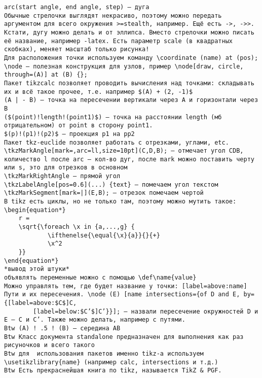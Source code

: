 \documentclass[a4paper, 12pt]{article}
\begin{document}
\begin{verbatim}
arc(start angle, end angle, step) – дуга
Обычные стрелочки выглядят некрасиво, поэтому можно передать аргументом для всего окружения >=stealth, например. Ещё есть ->, ->>. Кстати, дугу можно делать и от эллипса. Вместо стрелочки можно писать её название, например -latex. Есть параметр scale (в квадратных скобках), меняет масштаб только рисунка!
Для расположения точки используем команду \coordinate (name) at (pos);
\node – полезная конструкция для узлов, пример \node[draw, circle, through=(A)] at (B) {};
Пакет tikzcalc позволяет проводить вычисления над точками: складывать их и всё такое прочее, т.е. например $(A) + (2, -1)$
(A | - B) – точка на пересечении вертикали через A и горизонтали через B
($(point)!length!(point1)$) – точка на расстоянии length (мб отрицательном) от point в сторону point1.
$(p)!(p1)!(p2)$ – проекция p1 на pp2
Пакет tkz-euclide позволяет работать с отрезками, углами, etc.
\tkzMarkAngle[mark=,arc=ll,size=10pt](C,D,B); – отмечает угол CDB, количество l после arc – кол-во дуг, после mark можно поставить черту или s, это для отрезков в основном
\tkzMarkRightAngle – прямой угол
\tkzLabelAngle[pos=0.6](...) {text} – помечаем угол текстом
\tkzMarkSegment[mark=|](E,B); – отрезок помечаем чертой
В tikz есть циклы, но не только там, поэтому можно мутить такое:
\begin{equation*}
	r =
	\sqrt{\foreach \x in {a,...,g} {
			\ifthenelse{\equal{\x}{a}}{}{+}
			\x^2
	}}
\end{equation*}
*вывод этой штуки* 
объявлять переменные можно с помощью \def\name{value}
Можно управлять тем, где будет название у точки: [label=above:name]
Пути и их пересечения. \node (E) [name intersections={of D and E, by={[label=above:$C$]C,
		[label=below:$C’$]C’}}]; – назвали пересечение окружностей D и E – C и C’. Также можно делать, например с путями.
Btw (A) ! .5 ! (B) – середина AB
Btw Класс документа standalone предназначен для выполнения как раз рисуночков и всего такого
Btw для  использования пакетов именно tikz-а используем \usetikzlibrary{name} (например calc, intersections и т.д.)
Btw Есть прекраснейшая книга по tikz, называется TikZ & PGF. 
\end{verbatim}
\end{document}
